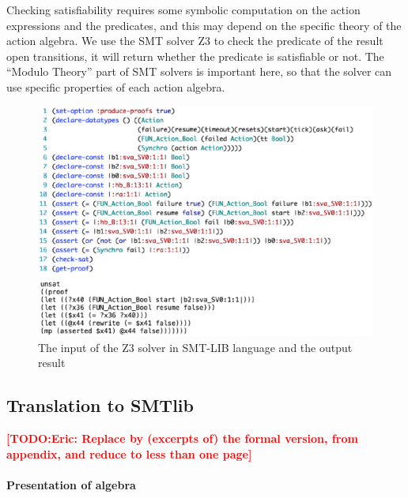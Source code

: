 \documentclass{lncs/llncs}
\newcommand{\TODO}[1]{\textcolor{red}{\textbf{[TODO:#1]}}}
\begin{document}
Checking satisfiability requires some symbolic computation
on the action expressions and the predicates, and this 
may depend on the specific theory of the action algebra. 
We use the SMT solver Z3 to check the predicate of the result open transitions, 
it will return whether the predicate is satisfiable or not.
The ``Modulo Theory'' part of SMT solvers is important here, so that
the solver can use specific properties of each action algebra.


\begin{figure}[t]
    \centerline{\includegraphics[width=\linewidth]{XFIG/SMTLIB3}}
  \caption{The input of the Z3 solver in SMT-LIB language and the output result}  \label{schema:smt-lib}
\end{figure}


\subsection{Translation to SMTlib}

\TODO{Eric: Replace by (excerpts of) the formal version, from appendix, and reduce to less than one page}

\paragraph{Presentation of algebra}
\end{document}
